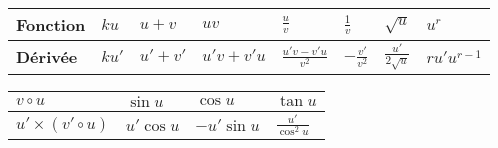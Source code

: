 \begin{tabularx}{\textwidth}{|X|X|X|X|X|X|X|X|}
\hline 
\textbf{Fonction }& $ ku $ &$ u+v $ & $ uv $ & $\frac{u}{v}$ & $\frac{1}{v} $ & $ \sqrt{u} $ &  $ u^{r} $ \\     
\hline 
\textbf{Dérivée} & $ ku' $ & $ u'+v' $ & $u'v+ v'u  $ & $ \frac{u'v- v'u }{v^{2}} $ &  $- \frac{v'}{v^{2}} $ & $ \frac{u'}{2\sqrt{u}} $ & $ ru'u^{r-1} $  \\    
\hline
\end{tabularx}

\bigskip
\begin{tabularx}{\textwidth}{|X|X|X|X|}
\hline
  $ v\circ u $ & $ \sin u $ & $ \cos u $ & $ \tan u $\\
\hline
$ u'\times (v'\circ u) $  & $ u'\cos u $ & $-u'\sin u$ & $ \frac{u'}{\cos^{2}u}$  \\     
 \hline
\end{tabularx}




